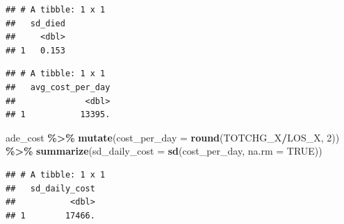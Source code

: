 \documentclass[preprint, 3p,
authoryear]{elsarticle} %
\newenvironment{Shaded}{\begin{snugshade}}{\end{snugshade}}
\newcommand{\CommentTok}[1]{\textcolor[rgb]{0.56,0.35,0.01}{\textit{#1}}}
\newcommand{\DataTypeTok}[1]{\textcolor[rgb]{0.13,0.29,0.53}{#1}}
\newcommand{\DecValTok}[1]{\textcolor[rgb]{0.00,0.00,0.81}{#1}}
\newcommand{\KeywordTok}[1]{\textcolor[rgb]{0.13,0.29,0.53}{\textbf{#1}}}
\newcommand{\NormalTok}[1]{#1}
\newcommand{\OperatorTok}[1]{\textcolor[rgb]{0.81,0.36,0.00}{\textbf{#1}}}
\newcommand{\OtherTok}[1]{\textcolor[rgb]{0.56,0.35,0.01}{#1}}
\newcommand{\StringTok}[1]{\textcolor[rgb]{0.31,0.60,0.02}{#1}}
\begin{document}
\begin{verbatim}
## # A tibble: 1 x 1
##   sd_died
##     <dbl>
## 1   0.153
\end{verbatim}

\begin{Shaded}
\end{Shaded}

\begin{verbatim}
## # A tibble: 1 x 1
##   avg_cost_per_day
##              <dbl>
## 1           13395.
\end{verbatim}

\begin{Shaded}
\begin{Highlighting}[]
\NormalTok{ade\_cost }\OperatorTok{\%\textgreater{}\%}
\StringTok{        }\KeywordTok{mutate}\NormalTok{(}\DataTypeTok{cost\_per\_day =} \KeywordTok{round}\NormalTok{(TOTCHG\_X}\OperatorTok{/}\NormalTok{LOS\_X, }\DecValTok{2}\NormalTok{)) }\OperatorTok{\%\textgreater{}\%}\StringTok{ }
\StringTok{        }\KeywordTok{summarize}\NormalTok{(}\DataTypeTok{sd\_daily\_cost =} \KeywordTok{sd}\NormalTok{(cost\_per\_day, }\DataTypeTok{na.rm =} \OtherTok{TRUE}\NormalTok{))}
\end{Highlighting}
\end{Shaded}

\begin{verbatim}
## # A tibble: 1 x 1
##   sd_daily_cost
##           <dbl>
## 1        17466.
\end{verbatim}
\end{document}

